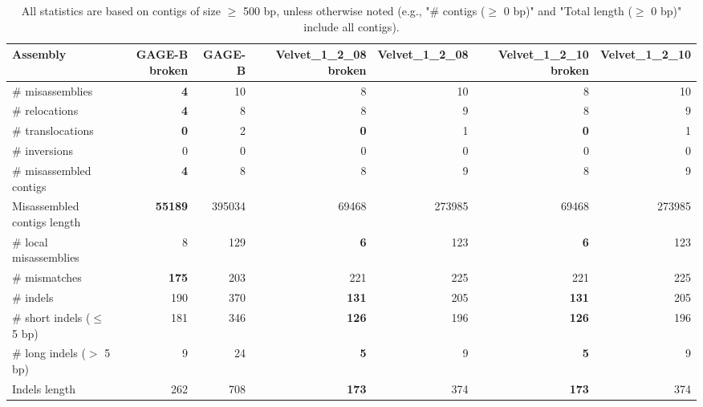 \documentclass[12pt,a4paper]{article}
\begin{document}
\begin{table}[ht]
\begin{center}
\caption{All statistics are based on contigs of size $\geq$ 500 bp, unless otherwise noted (e.g., "\# contigs ($\geq$ 0 bp)" and "Total length ($\geq$ 0 bp)" include all contigs).}
\begin{tabular}{|l*{6}{|r}|}
\hline
Assembly & GAGE-B broken & GAGE-B & Velvet\_1\_2\_08 broken & Velvet\_1\_2\_08 & Velvet\_1\_2\_10 broken & Velvet\_1\_2\_10 \\ \hline
\# misassemblies & {\bf 4} & 10 & 8 & 10 & 8 & 10 \\ \hline
\hspace{5mm}\# relocations & {\bf 4} & 8 & 8 & 9 & 8 & 9 \\ \hline
\hspace{5mm}\# translocations & {\bf 0} & 2 & {\bf 0} & 1 & {\bf 0} & 1 \\ \hline
\hspace{5mm}\# inversions & 0 & 0 & 0 & 0 & 0 & 0 \\ \hline
\# misassembled contigs & {\bf 4} & 8 & 8 & 9 & 8 & 9 \\ \hline
Misassembled contigs length & {\bf 55189} & 395034 & 69468 & 273985 & 69468 & 273985 \\ \hline
\# local misassemblies & 8 & 129 & {\bf 6} & 123 & {\bf 6} & 123 \\ \hline
\# mismatches & {\bf 175} & 203 & 221 & 225 & 221 & 225 \\ \hline
\# indels & 190 & 370 & {\bf 131} & 205 & {\bf 131} & 205 \\ \hline
\hspace{5mm}\# short indels ($\leq$ 5 bp) & 181 & 346 & {\bf 126} & 196 & {\bf 126} & 196 \\ \hline
\hspace{5mm}\# long indels ($>$ 5 bp) & 9 & 24 & {\bf 5} & 9 & {\bf 5} & 9 \\ \hline
Indels length & 262 & 708 & {\bf 173} & 374 & {\bf 173} & 374 \\ \hline
\end{tabular}
\end{center}
\end{table}
\end{document}

